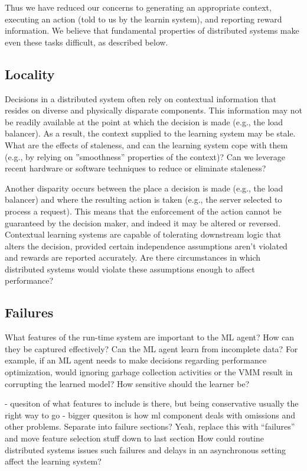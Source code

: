 \documentclass[a4paper,twocolumn]{article}
\begin{document}
Thus we have reduced our concerns to generating an appropriate context,
executing an action (told to us by the learnin system), and reporting reward
information.  We believe that fundamental properties of distributed systems make
even these tasks difficult, as described below.

\subsection*{Locality}

Decisions in a distributed system often rely on contextual information that
resides on diverse and physically disparate components. This information may not
be readily available at the point at which the decision is made (e.g., the load
balancer).  As a result, the context supplied to the learning system may be
stale. What are the effects of staleness, and can the learning system cope with
them (e.g., by relying on ''smoothness'' properties of the context)?  Can we
leverage recent hardware or software techniques to reduce or eliminate
staleness?

Another disparity occurs between the place a decision is made (e.g., the load
balancer) and where the resulting action is taken (e.g., the server selected to
process a request). This means that the enforcement of the action cannot be
guaranteed by the decision maker, and indeed it may be altered or reversed.
Contextual learning systems are capable of tolerating downstream logic
that alters the decision, provided certain independence assumptions
aren't violated and rewards are reported accurately. Are there circumstances in
which distributed systems would violate these assumptions enough to affect
performance?

\subsection*{Failures}

What features of the run-time system are important to the ML agent? How can they
be captured effectively? Can the ML agent learn from incomplete data? For
example, if an ML agent needs to make decisions regarding performance
optimization, would ignoring garbage collection activities or the VMM result in
corrupting the learned model? How sensitive should the learner be?

- quesiton of what features to include is there, but being conservative usually the right
way to go
- bigger quesiton is how ml component deals with omissions and other problems. Separate
into failure sections? Yeah, replace this with ``failures'' and move feature selection stuff
down to last section
How could routine
distributed systems issues such failures and delays in an asynchronous setting affect the
learning system?
\end{document}
